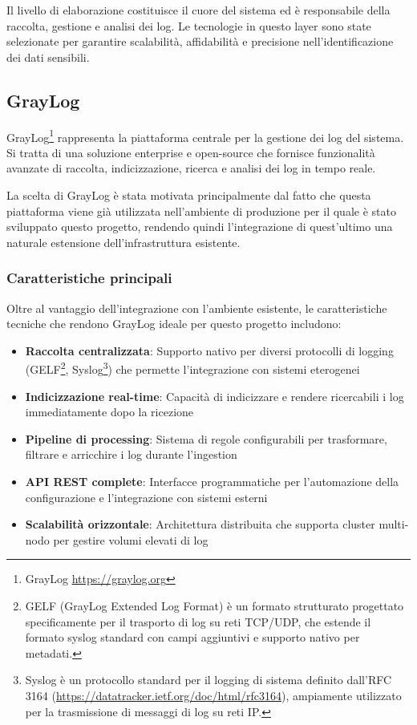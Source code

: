 \documentclass[12pt]{report}
\begin{document}
Il livello di elaborazione costituisce il cuore del sistema ed è responsabile della raccolta, gestione e analisi dei log. Le tecnologie in questo layer sono state selezionate per garantire scalabilità, affidabilità e precisione nell'identificazione dei dati sensibili.

\subsection{GrayLog}
\label{subsec:graylog}

GrayLog\footnote{GrayLog \url{https://graylog.org}} rappresenta la piattaforma centrale per la gestione dei log del sistema. \\
Si tratta di una soluzione enterprise e open-source che fornisce funzionalità avanzate di raccolta, indicizzazione, ricerca e analisi dei log in tempo reale.

La scelta di GrayLog è stata motivata principalmente dal fatto che questa piattaforma viene già utilizzata nell'ambiente di produzione per il quale è stato sviluppato questo progetto, rendendo quindi l'integrazione di quest'ultimo una naturale estensione dell'infrastruttura esistente.

\subsubsection{Caratteristiche principali}
Oltre al vantaggio dell'integrazione con l'ambiente esistente, le caratteristiche tecniche che rendono GrayLog ideale per questo progetto includono:

\begin{itemize}
    \item \textbf{Raccolta centralizzata}: Supporto nativo per diversi protocolli di logging (GELF\footnote{GELF (GrayLog Extended Log Format) è un formato strutturato progettato specificamente per il trasporto di log su reti TCP/UDP, che estende il formato syslog standard con campi aggiuntivi e supporto nativo per metadati.}, Syslog\footnote{Syslog è un protocollo standard per il logging di sistema definito dall'RFC 3164 (\url{https://datatracker.ietf.org/doc/html/rfc3164}), ampiamente utilizzato per la trasmissione di messaggi di log su reti IP.}) che permette l'integrazione con sistemi eterogenei
    \item \textbf{Indicizzazione real-time}: Capacità di indicizzare e rendere ricercabili i log immediatamente dopo la ricezione
    \item \textbf{Pipeline di processing}: Sistema di regole configurabili per trasformare, filtrare e arricchire i log durante l'ingestion
    \item \textbf{API REST complete}: Interfacce programmatiche per l'automazione della configurazione e l'integrazione con sistemi esterni
    \item \textbf{Scalabilità orizzontale}: Architettura distribuita che supporta cluster multi-nodo per gestire volumi elevati di log
\end{itemize}
\end{document}
